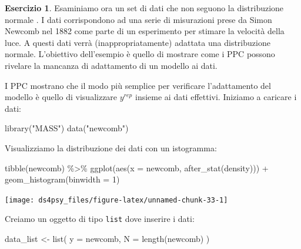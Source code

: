 \documentclass[
  11pt,
]{krantz}
\makeatletter
\newenvironment{Shaded}{\begin{snugshade}}{\end{snugshade}}
\newcommand{\AttributeTok}[1]{\textcolor[rgb]{0.61,0.61,0.61}{#1}}
\newcommand{\DecValTok}[1]{\textcolor[rgb]{0.06,0.06,0.06}{#1}}
\newcommand{\FunctionTok}[1]{\textcolor[rgb]{0,0,0}{#1}}
\newcommand{\NormalTok}[1]{#1}
\newcommand{\OtherTok}[1]{\textcolor[rgb]{0.37,0.37,0.37}{#1}}
\newcommand{\SpecialCharTok}[1]{\textcolor[rgb]{0,0,0}{#1}}
\newcommand{\StringTok}[1]{\textcolor[rgb]{0.5,0.5,0.5}{#1}}
\newenvironment{kframe}{%
\medskip{}
\setlength{\fboxsep}{.8em}
 \def\at@end@of@kframe{}%
 \ifinner\ifhmode%
  \def\at@end@of@kframe{\end{minipage}}%
  \begin{minipage}{\columnwidth}%
 \fi\fi%
 \def\FrameCommand##1{\hskip\@totalleftmargin \hskip-\fboxsep
 \colorbox{shadecolor}{##1}\hskip-\fboxsep
     \hskip-\linewidth \hskip-\@totalleftmargin \hskip\columnwidth}%
 \MakeFramed {\advance\hsize-\width
   \@totalleftmargin\z@ \linewidth\hsize
   \@setminipage}}%
 {\par\unskip\endMakeFramed%
 \at@end@of@kframe}
\renewenvironment{Shaded}{\begin{kframe}}{\end{kframe}}
\theoremstyle{definition}
\theoremstyle{definition}
\theoremstyle{definition}
\newtheorem{exercise}{Esercizio}[chapter]
\theoremstyle{definition}
\theoremstyle{remark}
\makeatother
\begin{document}
\begin{exercise}
Esaminiamo ora un set di dati che non seguono la distribuzione normale \citep{gelman2020regression}. I dati corrispondono ad una serie di misurazioni prese da Simon Newcomb nel 1882 come parte di un esperimento per stimare la velocità della luce. A questi dati verrà (inappropriatamente) adattata una distribuzione normale. L'obiettivo dell'esempio è quello di mostrare come i PPC possono rivelare la mancanza di adattamento di un modello ai dati.

I PPC mostrano che il modo più semplice per verificare l'adattamento del modello è quello di visualizzare \(y^{rep}\) insieme ai dati effettivi. Iniziamo a caricare i dati:

\begin{Shaded}
\begin{Highlighting}[]
\FunctionTok{library}\NormalTok{(}\StringTok{"MASS"}\NormalTok{)}
\FunctionTok{data}\NormalTok{(}\StringTok{"newcomb"}\NormalTok{)}
\end{Highlighting}
\end{Shaded}

Visualizziamo la distribuzione dei dati con un istogramma:

\begin{Shaded}
\begin{Highlighting}[]
\FunctionTok{tibble}\NormalTok{(newcomb) }\SpecialCharTok{\%\textgreater{}\%}
  \FunctionTok{ggplot}\NormalTok{(}\FunctionTok{aes}\NormalTok{(}\AttributeTok{x =}\NormalTok{ newcomb, }\FunctionTok{after\_stat}\NormalTok{(density))) }\SpecialCharTok{+}
  \FunctionTok{geom\_histogram}\NormalTok{(}\AttributeTok{binwidth =} \DecValTok{1}\NormalTok{)}
\end{Highlighting}
\end{Shaded}

\begin{center}\texttt{[image: ds4psy\_files/figure-latex/unnamed-chunk-33-1]} \end{center}

Creiamo un oggetto di tipo \texttt{list} dove inserire i dati:

\begin{Shaded}
\begin{Highlighting}[]
\NormalTok{data\_list }\OtherTok{\textless{}{-}} \FunctionTok{list}\NormalTok{(}
  \AttributeTok{y =}\NormalTok{ newcomb,}
  \AttributeTok{N =} \FunctionTok{length}\NormalTok{(newcomb)}
\NormalTok{)}
\end{Highlighting}
\end{Shaded}


\end{exercise}
\end{document}
